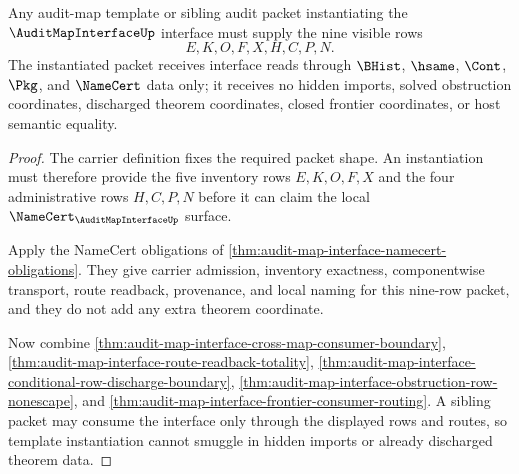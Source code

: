 \begin{theorem}
\label{thm:audit-map-interface-template-instantiation-boundary}
Any audit-map template or sibling audit packet instantiating the $\AuditMapInterfaceUp$ interface must supply the nine visible rows
$$
E,K,O,F,X,H,C,P,N.
$$
The instantiated packet receives interface reads through $\BHist$, $\hsame$, $\Cont$, $\Pkg$, and $\NameCert$ data only; it receives no hidden imports, solved obstruction coordinates, discharged theorem coordinates, closed frontier coordinates, or host semantic equality.
\end{theorem}
\begin{proof}
The carrier definition fixes the required packet shape. An instantiation must therefore provide the five inventory rows $E,K,O,F,X$ and the four administrative rows $H,C,P,N$ before it can claim the local $\NameCert_{\AuditMapInterfaceUp}$ surface.

Apply the NameCert obligations of \autoref{thm:audit-map-interface-namecert-obligations}. They give carrier admission, inventory exactness, componentwise transport, route readback, provenance, and local naming for this nine-row packet, and they do not add any extra theorem coordinate.

Now combine \autoref{thm:audit-map-interface-cross-map-consumer-boundary}, \autoref{thm:audit-map-interface-route-readback-totality}, \autoref{thm:audit-map-interface-conditional-row-discharge-boundary}, \autoref{thm:audit-map-interface-obstruction-row-nonescape}, and \autoref{thm:audit-map-interface-frontier-consumer-routing}. A sibling packet may consume the interface only through the displayed rows and routes, so template instantiation cannot smuggle in hidden imports or already discharged theorem data.
\end{proof}


